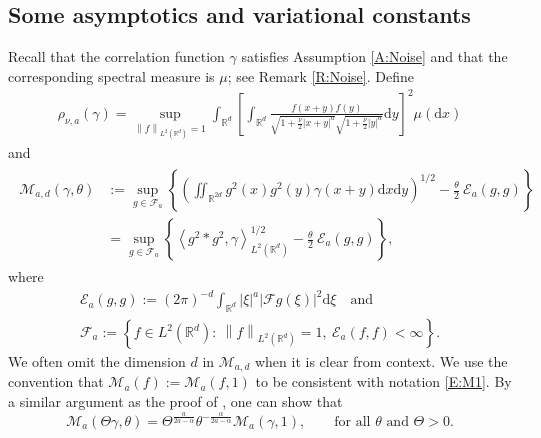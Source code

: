 \documentclass[12pt]{report}
\theoremstyle{plain}
\theoremstyle{definition}
\numberwithin{equation}{section}
\newcommand{\R}{\mathbb{R}}
\newcommand{\Norm}[1]{\left\|  #1   \right\|}
\newcommand{\ud}{\ensuremath{ \mathrm{d} }}
\begin{document}
\subsection{Some asymptotics and variational constants} \label{SS:Variation}

Recall that the correlation function $\gamma$ satisfies Assumption \ref{A:Noise} and that the
corresponding spectral measure is $\mu$; see Remark \ref{R:Noise}. Define
\begin{gather} \label{E:rho}
\rho_{\nu,a}(\gamma) = \sup_{\Norm{f}_{L^2(\R^d)} =1} \int_{\R^d} \left[ \int_{\R^d} \frac{f(x+y)f(y)}{\sqrt{1+\frac{\nu}{2}|x+y|^a } \sqrt{1+\frac{\nu}{2}|y|^a} } \ud y \right]^2 \mu(\ud x)
\end{gather}
and
\begin{gather} \label{E:Lambda}
\begin{aligned}
\mathcal{M}_{a,d}(\gamma,\theta)
& := \sup_{g \in \mathcal{F}_a} \left\{ \left( \iint_{\R^{2d}} g^2(x)g^2(y) \gamma(x+y)\ud x\ud y \right)^{1/2} - \frac{\theta}{2}\: \mathcal{E}_a(g,g) \right\} \\
& = \sup_{g \in \mathcal{F}_a} \left\{ \left\langle g^2 * g^2, \gamma \right\rangle_{L^2(\R^d)}^{1/2} - \frac{\theta}{2}\: \mathcal{E}_a(g,g) \right\},
\end{aligned}
\end{gather}
where
\begin{gather} \label{E:Egg}
\mathcal{E}_a(g,g) := (2\pi)^{-d} \int_{\R^d} |\xi|^a |\mathcal{F}g(\xi)|^2 \ud \xi \quad \text{and} \\
\mathcal{F}_a      := \left\{f\in L^2(\R^d): \: \Norm{f}_{L^2(\R^d)}=1,\: \mathcal{E}_a(f,f)<\infty \right\}.
\label{E:Fa}
\end{gather}
We often omit the dimension $d$ in  $ \mathcal{M}_{a,d}$ when it is clear from context.  We use the
convention that $\mathcal{M}_a(f):=\mathcal{M}_a(f,1)$ to be consistent with notation \eqref{E:M1}.
By a similar argument as the proof of \cite[Lemma 2.3]{balan.chen.ea:22:exact}, one can show that
\begin{equation} \label{E:ScaleM}
\mathcal{M}_a(\Theta \gamma , \theta) =
\Theta^{\frac{a}{2a-\alpha}}\theta^{-\frac{\alpha}{2a-\alpha}} \mathcal{M}_a( \gamma , 1),
\qquad \text{for all $\theta$ and $\Theta>0 $.}
\end{equation}
\end{document}
